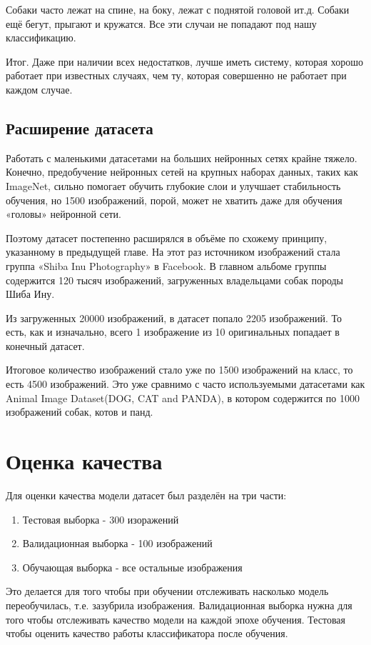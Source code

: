 Собаки часто лежат на спине, на боку, лежат с поднятой головой ит.д. Собаки ещё бегут, прыгают и кружатся. Все эти случаи не попадают под нашу классификацию.


Итог. Даже при наличии всех недостатков, лучше иметь систему, которая хорошо работает при известных случаях, чем ту, которая совершенно не работает при каждом случае. \cite{karpathy}


\subsection{Расширение датасета}\label{expanding_dataset}
Работать с маленькими датасетами на больших нейронных сетях крайне тяжело. Конечно, предобучение нейронных сетей на крупных наборах данных, таких как ImageNet, сильно помогает обучить глубокие слои и улучшает стабильность обучения, но 1500 изображений, порой, может не хватить даже для обучения «головы» нейронной сети.

Поэтому датасет постепенно расширялся в объёме по схожему принципу, указанному в предыдущей главе. На этот раз источником изображений стала группа «Shiba Inu Photography» в Facebook. В главном альбоме группы содержится 120 тысяч изображений, загруженных владельцами собак породы Шиба Ину.

Из загруженных 20000 изображений, в датасет попало 2205 изображений. То есть, как и изначально, всего 1 изображение из 10 оригинальных попадает в конечный датасет.

Итоговое количество изображений стало уже по 1500 изображений на класс, то есть 4500 изображений. Это уже сравнимо с часто используемыми датасетами как Animal Image Dataset(DOG, CAT and PANDA), в котором содержится по 1000 изображений собак, котов и панд. 


\section{Оценка качества} \label{quality}
Для оценки качества модели датасет был разделён на три части: 
\begin{enumerate}
    \item Тестовая выборка - 300 изоражений
    \item Валидационная выборка - 100 изображений
    \item Обучающая выборка - все остальные изображения
\end{enumerate}

Это делается для того чтобы при обучении отслеживать насколько модель переобучилась, т.е. зазубрила изображения. Валидационная выборка нужна для того чтобы отслеживать качество модели на каждой эпохе обучения. Тестовая чтобы оценить качество работы классификатора после обучения.

